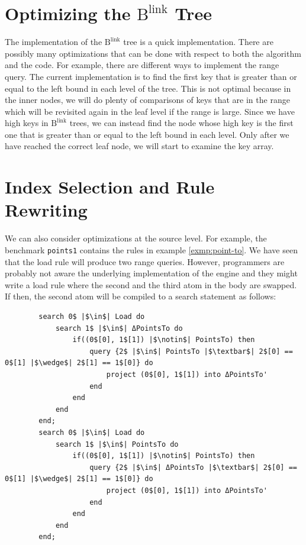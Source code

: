 \documentclass[11pt]{report}
\theoremstyle{definition}
\begin{document}
\section{Optimizing the $\text{B}^{\text{link}}$ Tree}

The implementation of the $\text{B}^{\text{link}}$ tree is a quick implementation. There are possibly many optimizations that can be done with respect to both the algorithm and the code. For example, there are different ways to implement the range query. The current implementation is to find the first key that is greater than or equal to the left bound in each level of the tree. This is not optimal because in the inner nodes, we will do plenty of comparisons of keys that are in the range which will be revisited again in the leaf level if the range is large. Since we have high keys in $\text{B}^{\text{link}}$ trees, we can instead find the node whose high key is the first one that is greater than or equal to the left bound in each level. Only after we have reached the correct leaf node, we will start to examine the key array.

\section{Index Selection and Rule Rewriting}

We can also consider optimizations at the source level. For example, the benchmark \texttt{points1} contains the rules in example \ref{exmp:point-to}. We have seen that the load rule will produce two range queries. However, programmers are probably not aware the underlying implementation of the engine and they might write a load rule where the second and the third atom in the body are swapped. If then, the second atom will be compiled to a search statement as follows:

\begin{verbatim}
        search 0$ |$\in$| Load do
            search 1$ |$\in$| ΔPointsTo do
                if((0$[0], 1$[1]) |$\notin$| PointsTo) then
                    query {2$ |$\in$| PointsTo |$\textbar$| 2$[0] == 0$[1] |$\wedge$| 2$[1] == 1$[0]} do
                        project (0$[0], 1$[1]) into ΔPointsTo'
                    end
                end
            end
        end;
        search 0$ |$\in$| Load do
            search 1$ |$\in$| PointsTo do
                if((0$[0], 1$[1]) |$\notin$| PointsTo) then
                    query {2$ |$\in$| ΔPointsTo |$\textbar$| 2$[0] == 0$[1] |$\wedge$| 2$[1] == 1$[0]} do
                        project (0$[0], 1$[1]) into ΔPointsTo'
                    end
                end
            end
        end;
\end{verbatim}
\end{document}
